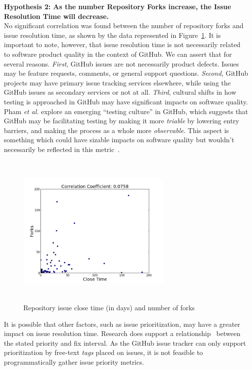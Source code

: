 \documentclass{proc}
\begin{document}
{{{{{{\noindent \textbf{Hypothesis 2: As the number Repository Forks increase, the Issue Resolution Time will decrease.}\\
No significant correlation was found between the number of repository forks and issue resolution time, as shown by the data represented in Figure~\ref{fig:issue_close_time_forks_scatterplot}. It is important to note, however, that issue resolution time is not necessarily related to software product quality in the context of GitHub. We can assert that for several reasons. \textit{First}, GitHub issues are not necessarily product defects. Issues may be feature requests, comments, or general support questions. \textit{Second}, GitHub projects may have primary issue tracking services elsewhere, while using the GitHub issues as secondary services or not at all. \textit{Third}, cultural shifts in how testing is approached in GitHub may have significant impacts on software quality. Pham \textit{et al.} explore an emerging ``testing culture'' in GitHub, which suggests that GitHub may be facilitating testing by making it more \emph{triable} by lowering entry barriers, and making the process as a whole more \emph{observable}. This aspect is something which could have sizable impacts on software quality but wouldn't necessarily be reflected in this metric~\cite{phamcreating}.

\begin{figure}
\includegraphics[height=3in,width=3in]{images/issue_close_time_forks_scatterplot.png}
\caption{Repository issue close time (in days) and number of forks}
\label{fig:issue_close_time_forks_scatterplot}
\end{figure}

It is possible that other factors, such as issue prioritization, may have a greater impact on issue resolution time. Research does support a relationship~\cite{mockus2002two} between the stated priority and fix interval. As the GitHub issue tracker can only support prioritization by free-text \textit{tags} placed on issues, it is not feasible to programmatically gather issue priority metrics.\\

}}}}}}
\end{document}
